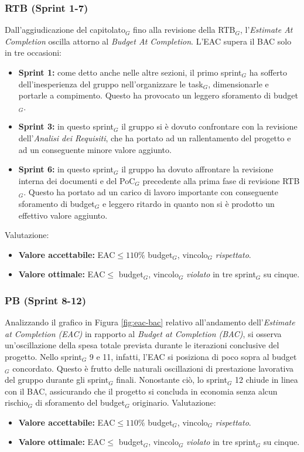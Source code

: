 \documentclass[a4paper, 10pt, colorlinks=true, linkcolor=black, urlcolor=blue, citecolor=blue, hidelinks]{article}
\begin{document}
\subsubsection{RTB (Sprint 1-7)}
Dall'aggiudicazione del capitolato$_G$ fino alla revisione della RTB$_G$, l'\textit{Estimate At Completion} oscilla attorno al \textit{Budget At Completion}. L'EAC supera il BAC solo in tre occasioni:
\begin{itemize}
    \item \textbf{Sprint 1:} come detto anche nelle altre sezioni, il primo sprint$_G$ ha sofferto dell'inesperienza del gruppo nell'organizzare le task$_G$, dimensionarle e portarle a compimento. Questo ha provocato un leggero sforamento di budget$_G$.
    \item \textbf{Sprint 3:} in questo sprint$_G$ il gruppo si è dovuto confrontare con la revisione dell'\textit{Analisi dei Requisiti}, che ha portato ad un rallentamento del progetto e ad un conseguente minore valore aggiunto.
    \item \textbf{Sprint 6:} in questo sprint$_G$ il gruppo ha dovuto affrontare la revisione interna dei documenti e del PoC$_G$ precedente alla prima fase di revisione RTB$_G$. Questo ha portato ad un carico di lavoro importante con conseguente sforamento di budget$_G$ e leggero ritardo in quanto non si è prodotto un effettivo valore aggiunto.
\end{itemize} 
Valutazione:
\begin{itemize}
    \item \textbf{Valore accettabile:} EAC$\leq 110\%$ budget$_G$, vincolo$_G$ \textit{rispettato}.
    \item \textbf{Valore ottimale:} EAC$\leq$ budget$_G$, vincolo$_G$ \textit{violato} in tre sprint$_G$ su cinque.
\end{itemize}

\subsubsection{PB (Sprint 8-12)}
Analizzando il grafico in Figura \ref{fig:eac-bac} relativo all'andamento dell'\textit{Estimate at Completion (EAC)} in rapporto al \textit{Budget at Completion (BAC)}, si osserva un'oscillazione della spesa totale prevista durante le iterazioni conclusive del progetto. 
Nello sprint$_G$ 9 e 11, infatti, l'EAC si posiziona di poco sopra al budget$_G$ concordato. Questo è frutto delle naturali oscillazioni di prestazione lavorativa del gruppo durante gli sprint$_G$ finali. 
Nonostante ciò, lo sprint$_G$ 12 chiude in linea con il BAC, assicurando che il progetto si concluda in economia senza alcun rischio$_G$ di sforamento del budget$_G$ originario.
Valutazione:
\begin{itemize}
    \item \textbf{Valore accettabile:} EAC$\leq 110\%$ budget$_G$, vincolo$_G$ \textit{rispettato}.
    \item \textbf{Valore ottimale:} EAC$\leq$ budget$_G$, vincolo$_G$ \textit{violato} in tre sprint$_G$ su cinque.
\end{itemize}
\end{document}
